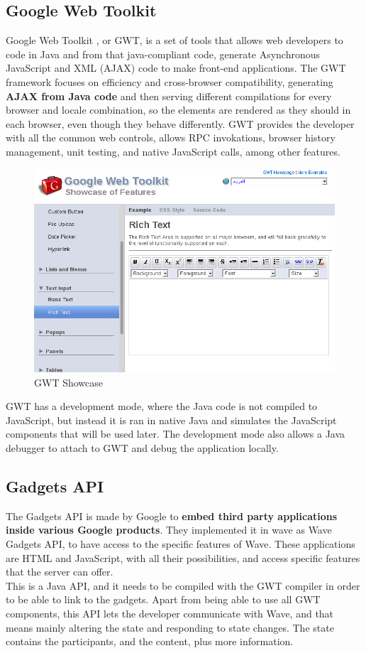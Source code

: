 \subsection{Google Web Toolkit}
Google Web Toolkit \cite{ref:gwt}, or GWT, is a set of tools that allows web developers to code in Java and from that java-compliant code, generate Asynchronous JavaScript and XML (AJAX) code to make front-end applications. The GWT framework focuses on efficiency and cross-browser compatibility, generating \textbf{AJAX from Java code} and then serving different compilations for every browser and locale combination, so the elements are rendered as they should in each browser, even though they behave differently. GWT provides the developer with all the common web controls, allows RPC invokations, browser history management, unit testing, and native JavaScript calls, among other features.
\begin{figure}[H]
  \center
    \includegraphics[keepaspectratio, scale=0.4]{Media/Captures/GWT/gwt_showcase.png}
  \caption{GWT Showcase}
  \label{fig:gwt_showcase}
\end{figure}
GWT has a development mode, where the Java code is not compiled to JavaScript, but instead it is ran in native Java and simulates the JavaScript components that will be used later. The development mode also allows a Java debugger to attach to GWT and debug the application locally. 

\subsection{Gadgets API}
The Gadgets API \cite{ref:gadgets_api} is made by Google to \textbf{embed third party applications inside various Google products}. They implemented it in wave as Wave Gadgets API, to have access to the specific features of Wave. These applications are HTML and JavaScript, with all their possibilities, and access specific features that the server can offer.\\[.2cm]
This is a Java API, and it needs to be compiled with the GWT compiler in order to be able to link to the gadgets. Apart from being able to use all GWT components, this API lets the developer communicate with Wave, and that means mainly altering the state and responding to state changes. The state contains the participants, and the content, plus more information.

